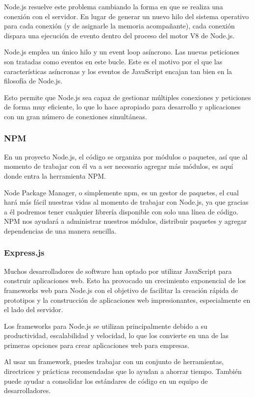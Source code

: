 Node.js resuelve este problema cambiando la forma en que se realiza una conexión con el servidor. En lugar de generar un nuevo hilo del sistema operativo para cada conexión (y de asignarle la memoria acompañante), cada conexión dispara una ejecución de evento dentro del proceso del motor V8 de Node.js.

Node.js emplea un único hilo y un event loop asíncrono. Las nuevas peticiones son tratadas como eventos en este bucle. Este es el motivo por el que las características asíncronas y los eventos de JavaScript encajan tan bien en la filosofía de Node.js.

Esto permite que Node.js sea capaz de gestionar múltiples conexiones y peticiones de forma muy eficiente, lo que lo hace apropiado para desarrollo y aplicaciones con un gran número de conexiones simultáneas.

\subsubsection{NPM}

En un proyecto Node.js, el código se organiza por módulos o paquetes, así que al momento de trabajar con él va a ser necesario agregar más módulos, es aquí donde entra la herramienta NPM.

Node Package Manager, o simplemente npm, es un gestor de paquetes, el cual hará más fácil nuestras vidas al momento de trabajar con Node.js, ya que gracias a él podremos tener cualquier librería disponible con solo una línea de código. NPM nos ayudará a administrar nuestros módulos, distribuir paquetes y agregar dependencias de una manera sencilla.

\subsubsection{Express.js}

Muchos desarrolladores de software han optado por utilizar JavaScript para construir aplicaciones web. Esto ha provocado un crecimiento exponencial de los frameworks web para Node.js con el objetivo de facilitar la creación rápida de prototipos y la construcción de aplicaciones web impresionantes, especialmente en el lado del servidor.

Los frameworks para Node.js se utilizan principalmente debido a su productividad, escalabilidad y velocidad, lo que los convierte en una de las primeras opciones para crear aplicaciones web para empresas.

Al usar un framework, puedes trabajar con un conjunto de herramientas, directrices y prácticas recomendadas que lo ayudan a ahorrar tiempo. También puede ayudar a consolidar los estándares de código en un equipo de desarrolladores.

